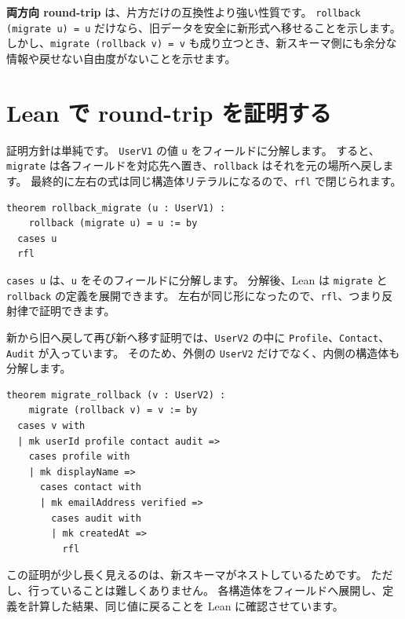 \textbf{両方向 round-trip} は、片方だけの互換性より強い性質です。
\texttt{rollback (migrate u) = u} だけなら、旧データを安全に新形式へ移せることを示します。
しかし、\texttt{migrate (rollback v) = v} も成り立つとき、新スキーマ側にも余分な情報や戻せない自由度がないことを示せます。

\section{Lean で round-trip を証明する}

証明方針は単純です。
\texttt{UserV1} の値 \texttt{u} をフィールドに分解します。
すると、\texttt{migrate} は各フィールドを対応先へ置き、\texttt{rollback} はそれを元の場所へ戻します。
最終的に左右の式は同じ構造体リテラルになるので、\texttt{rfl} で閉じられます。

\begin{listing}[htbp]
\begin{verbatim}
theorem rollback_migrate (u : UserV1) :
    rollback (migrate u) = u := by
  cases u
  rfl
\end{verbatim}
\caption{\texttt{rollback\_migrate}}
\label{lst:ch28-rollback-migrate}
\end{listing}

\texttt{cases u} は、\texttt{u} をそのフィールドに分解します。
分解後、Lean は \texttt{migrate} と \texttt{rollback} の定義を展開できます。
左右が同じ形になったので、\texttt{rfl}、つまり反射律で証明できます。

新から旧へ戻して再び新へ移す証明では、\texttt{UserV2} の中に \texttt{Profile}、\texttt{Contact}、\texttt{Audit} が入っています。
そのため、外側の \texttt{UserV2} だけでなく、内側の構造体も分解します。

\begin{listing}[htbp]
\begin{verbatim}
theorem migrate_rollback (v : UserV2) :
    migrate (rollback v) = v := by
  cases v with
  | mk userId profile contact audit =>
    cases profile with
    | mk displayName =>
      cases contact with
      | mk emailAddress verified =>
        cases audit with
        | mk createdAt =>
          rfl
\end{verbatim}
\caption{\texttt{migrate\_rollback}}
\label{lst:ch28-migrate-rollback}
\end{listing}

この証明が少し長く見えるのは、新スキーマがネストしているためです。
ただし、行っていることは難しくありません。
各構造体をフィールドへ展開し、定義を計算した結果、同じ値に戻ることを Lean に確認させています。

